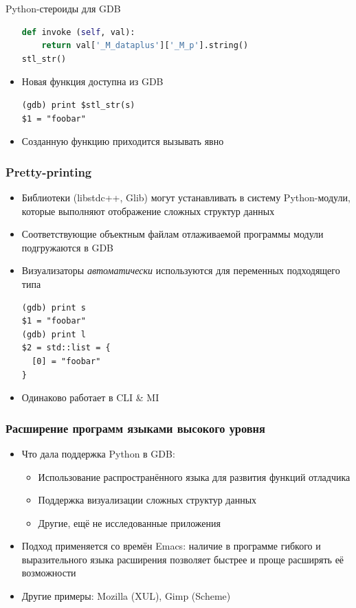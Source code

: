 \documentclass[onlymath]{beamer}
\begin{document}
\begin{subsection}{Python-стероиды для GDB}
\begin{frame}[fragile]
\begin{itemize}
\begin{lstlisting}[language=Python]
  def invoke (self, val):
    return val['_M_dataplus']['_M_p'].string()
stl_str()
\end{lstlisting}
  \item Новая функция доступна из GDB
\begin{lstlisting}[style=gdbsession]
(gdb) print $stl_str(s)
$1 = "foobar"
\end{lstlisting}
  \item Созданную функцию приходится вызывать явно
  \end{itemize}
\end{frame}  

\begin{frame}[fragile]
  \frametitle{Pretty-printing}
  \begin{itemize}
  \item Библиотеки (libstdc++, Glib) могут устанавливать в систему
    Python-модули, которые выполняют отображение сложных структур
    данных
  \item Соответствующие объектным файлам отлаживаемой программы модули
    подгружаются в GDB
  \item Визуализаторы \emph{автоматически} используются для переменных
    подходящего типа
\begin{lstlisting}[style=gdbsession]
(gdb) print s
$1 = "foobar"
(gdb) print l
$2 = std::list = {
  [0] = "foobar"
}
\end{lstlisting}
  \item Одинаково работает в CLI \& MI
  \end{itemize}
\end{frame}
\end{subsection}

\begin{frame}
  \frametitle{Расширение программ языками высокого уровня}
  \begin{itemize}
  \item Что дала поддержка Python в GDB:
    \begin{itemize}
    \item Использование распространённого языка для развития функций
      отладчика
    \item Поддержка визуализации сложных структур данных
    \item Другие, ещё не исследованные приложения
    \end{itemize}
  \item Подход применяется со времён Emacs: наличие в программе
    гибкого и выразительного языка расширения позволяет быстрее и
    проще расширять её возможности
  \item Другие примеры: Mozilla (XUL), Gimp (Scheme)
  \end{itemize}
\end{frame}
\end{document}
